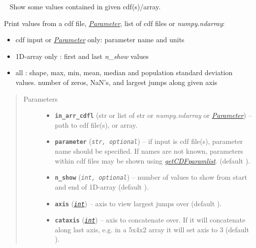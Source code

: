 \documentclass[letterpaper,10pt,english]{sphinxhowto}
\begin{document}
\begin{fulllineitems}
\label{swtools_doc:swtools.param_peek}~\label{swtools_doc:param-peek}
Show some values contained in given cdf(s)/array.

Print values from a cdf file, {\hyperref[swtools_doc:parameter]{\emph{Parameter}}}, list of cdf files or
\emph{numpy.ndarray}:
\begin{itemize}
\item {} 
cdf input or {\hyperref[swtools_doc:parameter]{\emph{Parameter}}} only: parameter name and units

\item {} 
1D-array only :  first and last \emph{n\_show} values

\item {} 
all : shape, max, min, mean, median and population
standard deviation values.
number of zeros, NaN's, and largest jumps along given axis

\end{itemize}
\begin{quote}\begin{description}
\item[{Parameters}] \leavevmode\begin{itemize}
\item {} 
\textbf{\texttt{in\_arr\_cdfl}} (str or list of str or \emph{numpy.ndarray} or {\hyperref[swtools_doc:parameter]{\emph{Parameter}}}) -- path to cdf file(s), or array.

\item {} 
\textbf{\texttt{parameter}} (\emph{\texttt{str, optional}}) -- if input is cdf file(s), parameter name should be specified. If
names are not known, parameters within cdf files may be shown
using {\hyperref[swtools_doc:getcdfparamlist]{\emph{getCDFparamlist}}}. (default ).

\item {} 
\textbf{\texttt{n\_show}} (\emph{\texttt{int, optional}}) -- number of values to show from start and end of 1D-array
(default ).

\item {} 
\textbf{\texttt{axis}} (\href{https://docs.python.org/library/functions.html\#int}{\emph{\texttt{int}}}) -- axis to view largest jumps over (default ).

\item {} 
\textbf{\texttt{cataxis}} (\href{https://docs.python.org/library/functions.html\#int}{\emph{\texttt{int}}}) -- axis to concatenate over. If  it will concatenate
along last axis, e.g. in a 5x4x2 array it will set axis to 3
(default ).

\end{itemize}

\end{description}\end{quote}

\end{fulllineitems}
\end{document}
